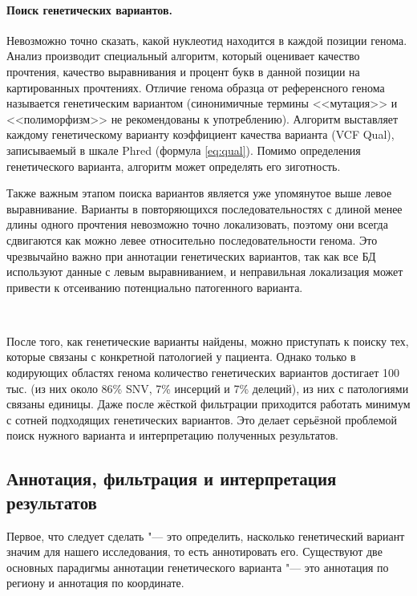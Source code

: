 \documentclass[a4paper,12pt]{article}
\begin{document}
\paragraph{Поиск генетических вариантов.}
Невозможно точно сказать, какой нуклеотид находится в каждой позиции генома.
Анализ производит специальный алгоритм, который оценивает качество прочтения, качество выравнивания и процент букв в данной позиции на картированных прочтениях.
Отличие генома образца от референсного генома называется генетическим вариантом (синонимичные термины <<мутация>> и <<полиморфизм>> не рекомендованы к употреблению\cite{Richards_2015}).
Алгоритм выставляет каждому генетическому варианту коэффициент качества варианта (VCF Qual), записываемый в шкале Phred (формула \ref{eq:qual}).
Помимо определения генетического варианта, алгоритм может определять его зиготность.

Также важным этапом поиска вариантов является уже упомянутое выше левое выравнивание.
Варианты в повторяющихся последовательностях с длиной менее длины одного прочтения невозможно точно локализовать, поэтому они всегда сдвигаются как можно левее относительно последовательности генома.
Это чрезвычайно важно при аннотации генетических вариантов, так как все БД используют данные с левым выравниванием, и неправильная локализация может привести к отсеиванию потенциально патогенного варианта.

~

После того, как генетические варианты найдены, можно приступать к поиску тех, которые связаны с конкретной патологией у пациента.
Однако только в кодирующих областях генома количество генетических вариантов достигает 100 тыс. (из них около 86\% SNV, 7\% инсерций и 7\% делеций)\cite{Supernat_2018}, из них с патологиями связаны единицы.
Даже после жёсткой фильтрации приходится работать минимум с сотней подходящих генетических вариантов.
Это делает серьёзной проблемой поиск нужного варианта и интерпретацию полученных результатов.

\subsection{Аннотация, фильтрация и интерпретация результатов}

Первое, что следует сделать "--- это определить, насколько генетический вариант значим для нашего исследования, то есть аннотировать его.
Существуют две основных парадигмы аннотации генетического варианта "--- это аннотация по региону и аннотация по координате.
\end{document}
